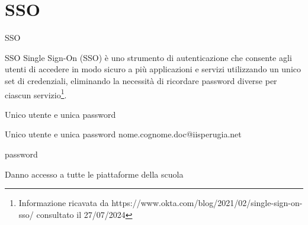 \section{SSO}
\begin{frame}{SSO}
	\begin{alertblock}{SSO}
		Single Sign-On (SSO) è uno strumento di autenticazione che consente agli utenti di accedere in modo sicuro a più applicazioni e servizi utilizzando un unico set di credenziali, eliminando la necessità di ricordare password diverse per ciascun servizio\footnote{Informazione ricavata da https://www.okta.com/blog/2021/02/single-sign-on-sso/ consultato il 27/07/2024}.
	\end{alertblock}
\end{frame}
\begin{frame}{Unico utente e unica password}
	\begin{alertblock}{Unico utente e unica password}
		nome.cognome.doc@iisperugia.net
		
		password 
		
		Danno accesso a tutte le piattaforme della scuola
	\end{alertblock}
\end{frame}

